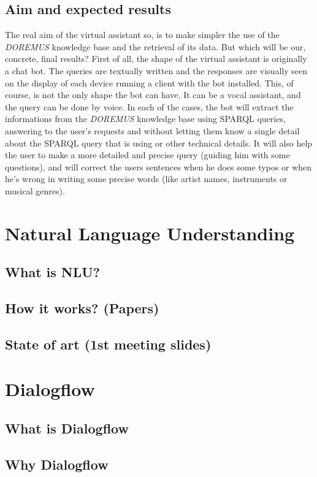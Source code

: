 \documentclass[a4paper,12pt]{report}
\begin{document}
	\section{Aim and expected results}
	The real aim of the virtual assistant so, is to make simpler the use of the \textit{DOREMUS} knowledge base and the retrieval of its data. But which will be our, concrete, final results? First of all, the shape of the virtual assistant is originally a chat bot. The queries are textually written and the responses are visually seen on the display of each device running a client with the bot installed. This, of course, is not the only shape the bot can have. It can be a vocal assistant, and the query can be done by voice. In each of the cases, the bot will extract the informations from the \textit{DOREMUS} knowledge base using SPARQL queries, answering to the user's requests and without letting them know a single detail about the SPARQL query that is using or other technical details. It will also help the user to make a more detailed and precise query (guiding him with some questions), and will correct the users sentences when he does some typos or when he's wrong in writing some precise words (like artist names, instruments or musical genres).

\chapter{Natural Language Understanding}
	\section{What is NLU?}
	\section{How it works? (Papers)}
	\section{State of art (1st meeting slides)}

\chapter{Dialogflow}
	\section{What is Dialogflow}
	\section{Why Dialogflow}
\end{document}
